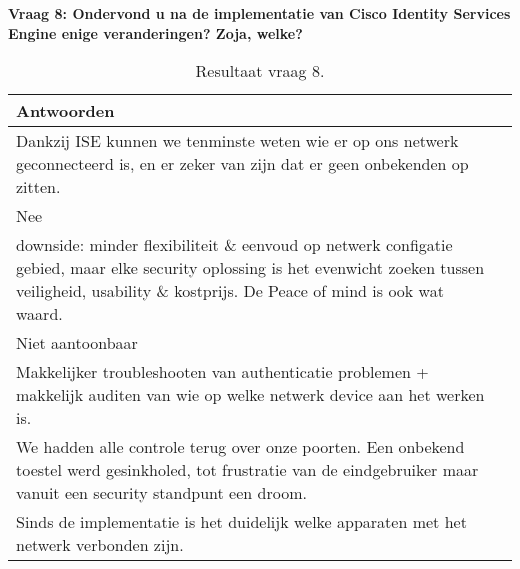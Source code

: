 \newpage
\textbf{Vraag 8: Ondervond u na de implementatie van Cisco Identity Services Engine enige veranderingen? Zoja, welke?}
\begin{table}[H]
	\begin{center}
		\newlength\q
		\setlength{}
		\noindent\begin{tabular}{p{\q}p{\q}}	
		\hline
		\bf Antwoorden \\ \hline
		Dankzij ISE kunnen we tenminste weten wie er op ons netwerk geconnecteerd is, en er zeker van zijn dat er geen onbekenden op zitten.                                                                       \\ \hline
		Nee                                                                                                                                                                                                        \\ \hline
		downside: minder flexibiliteit \& eenvoud op netwerk configatie gebied, maar elke security oplossing is het evenwicht zoeken tussen veiligheid, usability \& kostprijs. De Peace of mind is ook wat waard. \\ \hline
		Niet aantoonbaar                                                                                                                                                                                           \\ \hline
		Makkelijker troubleshooten van authenticatie problemen + makkelijk auditen van wie op welke netwerk device aan het werken is.                                                                              \\ \hline
		We hadden alle controle terug over onze poorten. Een onbekend toestel werd gesinkholed, tot frustratie van de eindgebruiker maar vanuit een security standpunt een droom.                                  \\ \hline
		Sinds de implementatie is het duidelijk welke apparaten met het netwerk verbonden zijn. \\ \hline
		\end{tabular}
		\caption{Resultaat vraag 8.}
	\end{center}
\end{table}

